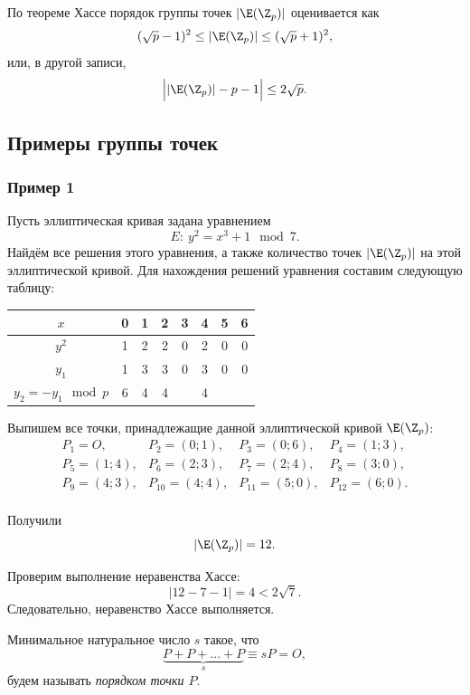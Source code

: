 По теореме Хассе порядок группы точек $|\E(\Z_p)|$ оценивается как
    \[ (\sqrt{p}-1)^2 \leq |\E(\Z_p)| \leq (\sqrt{p}+1)^2, \]
или, в другой записи,
    \[ \Big| |\E(\Z_p)| - p - 1 \Big| \leq 2 \sqrt{p}. \]

\subsection{Примеры группы точек}

\subsubsection{Пример 1}

Пусть эллиптическая кривая задана уравнением
    \[ E: ~ y^2 = x^3 + 1 \mod 7. \]
Найдём все решения этого уравнения, а также количество точек $|\E(\Z_p)|$ на этой эллиптической кривой. Для нахождения решений уравнения составим следующую таблицу:

\begin{center} \begin{tabular}{|c|c|c|c|c|c|c|c|}
    \hline
    $x$ & 0 & 1 & 2 & 3 & 4 & 5 & 6 \\
    \hline
    $y^2$ & 1 & 2 & 2 & 0 & 2 & 0 & 0 \\
    \hline
    $y_1$ & 1 & 3 & 3 & 0 & 3 & 0 & 0 \\
    \hline
    $y_2 = - y_1 \mod p$ & 6 & 4 & 4 &   & 4 &   &   \\
    \hline
\end{tabular} \end{center}

Выпишем все точки, принадлежащие данной эллиптической кривой $\E(\Z_p)$:
\[
    \begin{array}{cccc}
        P_1 = O, & P_2 = (0; 1), & P_3 = (0; 6), & P_4 = (1; 3), \\
        P_5 = (1; 4), & P_6 = (2; 3), & P_7 = (2; 4), & P_8 = (3; 0), \\
        P_9 = (4; 3), & P_{10} = (4; 4), & P_{11} = (5; 0), & P_{12} = (6; 0). \\
    \end{array}
\]

Получили
    \[ |\E(\Z_p)| = 12. \]

Проверим выполнение неравенства Хассе:
    \[ \left| 12 - 7 - 1 \right| = 4 < 2 \sqrt{7}. \]
Следовательно, неравенство Хассе выполняется.

Минимальное натуральное число $s$ такое, что
\[ \underbrace{P + P + \ldots + P}_{s} \equiv s P = O, \]
будем называть \emph{порядком точки $P$}.

